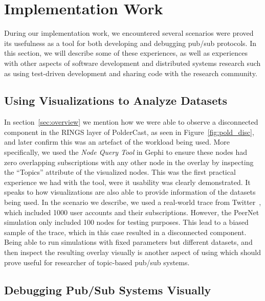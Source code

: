 \section{Implementation Work}

During our implementation work, we encountered several scenarios were
\demo proved its usefulness as a tool for both developing and debugging
pub/sub protocols. In this section, we will describe some of these
experiences, as well as experiences with other aspects of software
development and distributed systems research such as using test-driven
development and sharing code with the research community.

\subsection{Using Visualizations to Analyze Datasets}

In section~\ref{sec:overview} we mention how we were able to observe a
disconnected component in the RINGS layer of PolderCast, as seen in
Figure~\ref{fig:pold_disc}, and later confirm this was an artefact of
the workload being used. More specifically, we used the \emph{Node Query
    Tool} in Gephi to ensure these nodes had zero overlapping
subscriptions with any other node in the overlay by inspecting the
``Topics'' attribute of the visualized nodes. This was the first
practical experience we had with the tool, were it usability was clearly
demonstrated. It speaks to how visualizations are also able to provide
information of the datasets being used. In the scenario we describe, we
used a real-world trace from Twitter~\cite{Kwak10www}, which included
1000 user accounts and their subscriptions. However, the PeerNet
simulation only included 100 nodes for testing purposes. This lead to a
biased sample of the trace, which in this case resulted in a
disconnected component. Being able to run simulations with fixed
parameters but different datasets, and then inspect the resulting
overlay visually is another aspect of using \demo which should prove
useful for researcher of topic-based pub/sub systems.

\subsection{Debugging Pub/Sub Systems Visually}

